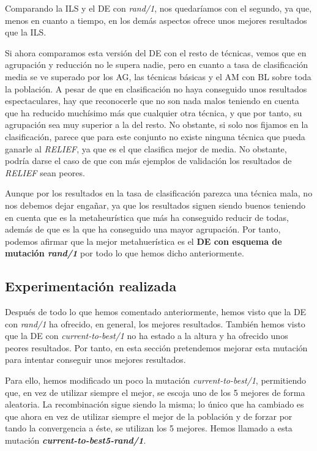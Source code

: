 \documentclass[11pt,a4paper]{article}
\begin{document}
Comparando la ILS y el DE con \textit{rand/1}, nos quedaríamos con el segundo, ya que, menos en cuanto a tiempo, en los demás
aspectos ofrece unos mejores resultados que la ILS.

Si ahora comparamos esta versión del DE con el resto de técnicas, vemos que en agrupación y reducción no le supera nadie, pero
en cuanto a tasa de clasificación media se ve superado por los AG, las técnicas básicas y el AM con BL sobre toda la población.
A pesar de que en clasificación no haya conseguido unos resultados espectaculares, hay que reconocerle que no son nada malos
teniendo en cuenta que ha reducido muchísimo más que cualquier otra técnica, y que por tanto, su agrupación sea muy superior a la
del resto. No obstante, si solo nos fijamos en la clasificación, parece que para este conjunto no existe ninguna técnica que pueda
ganarle al \textit{RELIEF}, ya que es el que clasifica mejor de media. No obstante, podría darse el caso de que con más ejemplos
de validación los resultados de \textit{RELIEF} sean peores.

Aunque por los resultados en la tasa de clasificación parezca una técnica mala, no nos debemos dejar engañar, ya que los resultados
siguen siendo buenos teniendo en cuenta que es la metaheurística que más ha conseguido reducir de todas, además de que es la que
ha conseguido una mayor agrupación. Por tanto, podemos afirmar que la mejor metahuerística es el \textbf{DE con esquema de mutación
\textit{rand/1}} por todo lo que hemos dicho anteriormente.

\subsection{Experimentación realizada}

Después de todo lo que hemos comentado anteriormente, hemos visto que la DE con \textit{rand/1} ha ofrecido, en general, los mejores
resultados. También hemos visto que la DE con \textit{current-to-best/1} no ha estado a la altura y ha ofrecido unos peores
resultados. Por tanto, en esta sección pretendemos mejorar esta mutación para intentar conseguir unos mejores resultados.

Para ello, hemos modificado un poco la mutación \textit{current-to-best/1}, permitiendo que, en vez de utilizar siempre el mejor,
se escoja uno de los 5 mejores de forma aleatoria. La recombinación sigue siendo la misma; lo único que ha cambiado es que ahora
en vez de utilizar siempre el mejor de la población y de forzar por tando la convergencia a éste, se utilizan los 5 mejores. Hemos
llamado a esta mutación \textbf{\textit{current-to-best5-rand/1}}.
\end{document}
